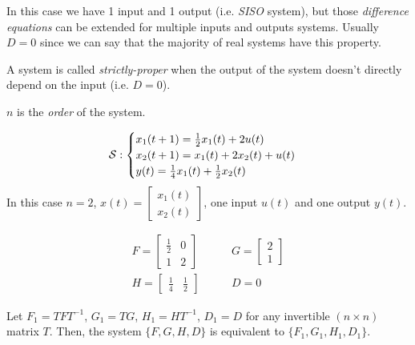 In this case we have 1 input and 1 output (i.e. \emph{SISO} system), but those \emph{difference equations} can be extended for multiple inputs and outputs systems. Usually $D=0$ since we can say that the majority of real systems have this property. 

\begin{defn} 
A system is called \emph{strictly-proper} when the output of the system doesn't directly depend on the input (i.e. $D=0$). 
\end{defn}

\begin{rem}
$n$ is the \emph{order} of the system.
\end{rem}

\begin{exa}[SISO system of order $n=2$]
    \[
    \mathcal{S}: 
        \begin{cases}
            x_1(t+1) = \frac{1}{2} x_1(t) + 2u(t) \\
            x_2(t+1) = x_1(t) + 2x_2(t) + u(t) \\
            y(t) = \frac{1}{4}x_1(t) + \frac{1}{2}x_2(t)
        \end{cases}
    \]
    In this case $n=2$, $x(t) = \begin{bmatrix}
        x_1(t) \\
        x_2(t)
    \end{bmatrix}$, one input $u(t)$ and one output $y(t)$.

    \begin{align*}
        F = \begin{bmatrix}
            \frac{1}{2} & 0 \\
            1 & 2
        \end{bmatrix}
        & \qquad
        G = \begin{bmatrix}
            2 \\ 1
        \end{bmatrix}
        \\
        H = \begin{bmatrix}
            \frac{1}{4} & \frac{1}{2}
        \end{bmatrix}
        & \qquad
        D = 0
    \end{align*}
\end{exa}


\begin{rem}
    Let $F_1 = TFT^{-1}$, $G_1 = TG$, $H_1 = HT^{-1}$, $D_1 = D$ for any invertible $(n\times n)$ matrix $T$. Then, the system $\{F, G, H, D\}$ is equivalent to $\{F_1, G_1, H_1, D_1\}$.
\end{rem}